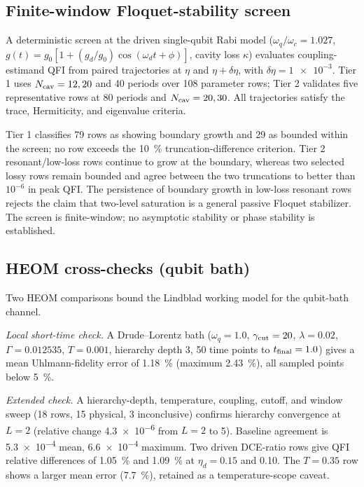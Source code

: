 \documentclass[aps,prxquantum,preprint,superscriptaddress,amsmath,amssymb]{revtex4-2}
\begin{document}
\subsection{Finite-window Floquet-stability screen}

A deterministic screen at the driven single-qubit Rabi model ($\omega_q/\omega_c=\num{1.027}$, $g(t)=g_0[1+(g_d/g_0)\cos(\omega_d t+\phi)]$, cavity loss $\kappa$) evaluates coupling-estimand QFI from paired trajectories at $\eta$ and $\eta+\delta\eta$, with $\delta\eta=\num{1e-3}$. Tier 1 uses $N_{\rm cav}=\num{12},\num{20}$ and \num{40} periods over \num{108} parameter rows; Tier 2 validates five representative rows at \num{80} periods and $N_{\rm cav}=\num{20},\num{30}$. All trajectories satisfy the trace, Hermiticity, and eigenvalue criteria.

Tier 1 classifies \num{79} rows as showing boundary growth and \num{29} as bounded within the screen; no row exceeds the \qty{10}{\percent} truncation-difference criterion. Tier 2 resonant/low-loss rows continue to grow at the boundary, whereas two selected lossy rows remain bounded and agree between the two truncations to better than $10^{-6}$ in peak QFI. The persistence of boundary growth in low-loss resonant rows rejects the claim that two-level saturation is a general passive Floquet stabilizer. The screen is finite-window; no asymptotic stability or phase stability is established.

\subsection{HEOM cross-checks (qubit bath)}
\label{sec:si_heom}

Two HEOM comparisons bound the Lindblad working model for the qubit-bath channel.

\textit{Local short-time check.} A Drude--Lorentz bath ($\omega_q=\num{1.0}$, $\gamma_{\rm cut}=\num{20}$, $\lambda=\num{0.02}$, $\Gamma=\num{0.012535}$, $T=\num{0.001}$, hierarchy depth \num{3}, \num{50} time points to $t_{\rm final}=\num{1.0}$) gives a mean Uhlmann-fidelity error of \qty{1.18}{\percent} (maximum \qty{2.43}{\percent}), all sampled points below \qty{5}{\percent}.

\textit{Extended check.} A hierarchy-depth, temperature, coupling, cutoff, and window sweep (\num{18} rows, \num{15} physical, \num{3} inconclusive) confirms hierarchy convergence at $L=\num{2}$ (relative change \num{4.3e-6} from $L=\num{2}$ to \num{5}). Baseline agreement is \num{5.3e-4} mean, \num{6.6e-4} maximum. Two driven DCE-ratio rows give QFI relative differences of \qty{1.05}{\percent} and \qty{1.09}{\percent} at $\eta_d=\num{0.15}$ and \num{0.10}. The $T=\num{0.35}$ row shows a larger mean error (\qty{7.7}{\percent}), retained as a temperature-scope caveat.
\end{document}
